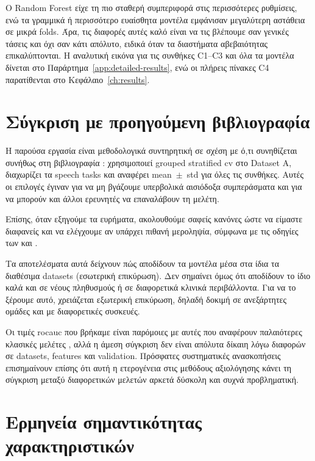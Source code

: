 Ο Random Forest είχε τη πιο σταθερή συμπεριφορά στις περισσότερες ρυθμίσεις, ενώ τα γραμμικά ή περισσότερο ευαίσθητα μοντέλα εμφάνισαν μεγαλύτερη αστάθεια σε μικρά folds. 
Άρα, τις διαφορές αυτές καλό είναι να τις βλέπουμε σαν γενικές τάσεις και όχι σαν κάτι απόλυτο, ειδικά όταν τα διαστήματα αβεβαιότητας επικαλύπτονται. 
Η αναλυτική εικόνα για τις συνθήκες C1--C3 και όλα τα μοντέλα δίνεται στο Παράρτημα~\ref{app:detailed-results}, ενώ οι πλήρεις πίνακες C4 παρατίθενται στο Κεφάλαιο~\ref{ch:results}.

\section{Σύγκριση με προηγούμενη βιβλιογραφία}

Η παρούσα εργασία είναι μεθοδολογικά συντηρητική σε σχέση με ό,τι συνηθίζεται συνήθως στη βιβλιογραφία \citep{ge2023inflation}: χρησιμοποιεί grouped stratified \gls{cv} στο Dataset A, διαχωρίζει τα speech tasks και αναφέρει mean~$\pm$~std για όλες τις συνθήκες. 
Αυτές οι επιλογές έγιναν για να μη βγάζουμε υπερβολικά αισιόδοξα συμπεράσματα και για να μπορούν και άλλοι ερευνητές να επαναλάβουν τη μελέτη.

Επίσης, όταν εξηγούμε τα ευρήματα, ακολουθούμε σαφείς κανόνες ώστε να είμαστε διαφανείς και να ελέγχουμε αν υπάρχει πιθανή μεροληψία, σύμφωνα με τις οδηγίες των  και  \citep{collins2024tripod,moons2025probast}.

Τα αποτελέσματα αυτά δείχνουν πώς αποδίδουν τα μοντέλα μέσα στα ίδια τα διαθέσιμα datasets (εσωτερική επικύρωση). 
Δεν σημαίνει όμως ότι αποδίδουν το ίδιο καλά και σε νέους πληθυσμούς ή σε διαφορετικά κλινικά περιβάλλοντα. 
Για να το ξέρουμε αυτό, χρειάζεται εξωτερική επικύρωση, δηλαδή δοκιμή σε ανεξάρτητες ομάδες και με διαφορετικές συσκευές.

Οι τιμές \gls{rocauc} που βρήκαμε είναι παρόμοιες με αυτές που αναφέρουν παλαιότερες κλασικές μελέτες \citep{little2009suitability, tsanas2012comparison, solana_lavalle2021analysis}, 
αλλά η άμεση σύγκριση δεν είναι απόλυτα δίκαιη λόγω διαφορών σε datasets, features και validation. 
Πρόσφατες συστηματικές ανασκοπήσεις \citep{xavier2025voice, wright2025vocal, sedigh_malekroodi2025voice} επισημαίνουν επίσης ότι αυτή η ετερογένεια στις μεθόδους αξιολόγησης κάνει τη σύγκριση μεταξύ διαφορετικών μελετών αρκετά δύσκολη και συχνά προβληματική.

\section{Ερμηνεία σημαντικότητας χαρακτηριστικών}

